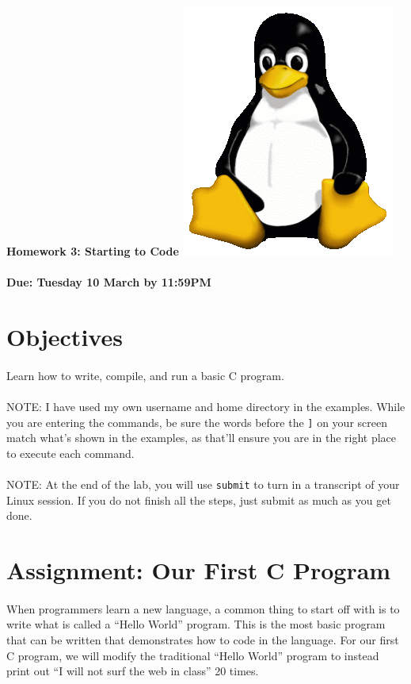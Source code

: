 \documentclass[letter,11pt]{article}
\begin{document}
\huge
\textbf{Homework 3: Starting to Code} \includegraphics[scale=0.07]{Images/Tux.png}
\normalsize
\\ ~~ \\
\textbf{Due: Tuesday 10 March by 11:59PM}

\section*{Objectives}
\paragraph{}Learn how to write, compile, and run a basic C program.

\paragraph{}NOTE: I have used my own username and home directory in the examples. While you are entering the commands, be sure the words before the \texttt{]} on your screen match what’s shown in the examples, as that’ll ensure you are in the right place to execute each command.

\paragraph{}NOTE: At the end of the lab, you will use \texttt{submit} to turn in a transcript of your Linux session. If you do not finish all the steps, just submit as much as you get done.

\section*{Assignment: Our First C Program}
\paragraph{}When programmers learn a new language, a common thing to start off with is to write what is called a ``Hello World'' program. This is the most basic program that can be written that demonstrates how to code in the language. For our first C program, we will modify the traditional ``Hello World'' program to instead print out ``I will not surf the web in class'' 20 times.
\end{document}
